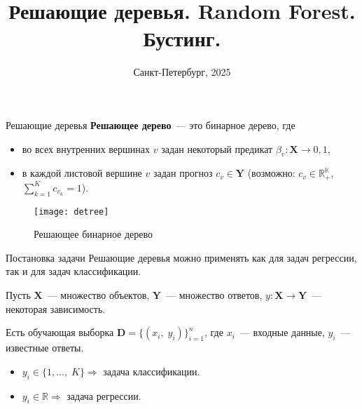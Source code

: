 \documentclass[notheorems, handout]{beamer}
\title[Статистическое и машинное обучение]{Решающие деревья. Random Forest. Бустинг.}
\institute[Санкт-Петербургский Государственный Университет]{%
	\small
	Санкт-Петербургский государственный университет\\
	Кафедра статистического моделирования
}
\date[Сентябрь 2025]{Санкт-Петербург, 2025}
\begin{document}
\begin{frame}
    \titlepage
\end{frame}

\begin{frame}{Решающие деревья}
\textbf{Решающее дерево}~--- это бинарное дерево, где
\begin{itemize}
	\item во всех внутренних вершинах $v$ задан некоторый предикат $\beta_{v}: \mathbf{X} \to {0{,} 1}$,
	\item в каждой листовой вершине $v$ задан прогноз $c_{v} \in \mathbf{Y}$ (возможно: $c_{v} \in \mathbb{R_{+}^{K}}$, \; $\displaystyle\sum_{k = 1}^{K} c_{v_{k}} = 1$).
\end{itemize}
\par\smallskip
\begin{figure}[h!]
  \texttt{[image: detree]}
 \caption{Решающее бинарное дерево}
 \end{figure}
\end{frame}

\begin{frame}{Постановка задачи}
Решающие деревья можно применять как для задач регрессии,
так и для задач классификации. 
\par\smallskip
Пусть $\mathbf{X}$~--- множество объектов, $\mathbf{Y}$~--- множество ответов, $y: \mathbf{X} \to \mathbf{Y}$~--- некоторая зависимость.
\par\smallskip
Есть обучающая выборка $\mathbf{D} = \{(x_{i}{,} \; y_{i})\}_{i = 1}^{n}$, где $x_{i}$~--- входные данные, $y_{i}$~--- известные ответы.
\par\smallskip
\begin{itemize}
	\item $y_{i} \in \{1{,}\dots{,}\;K\} \Rightarrow$ задача классификации.
	\item $y_{i} \in \mathbb{R} \Rightarrow$ задача регрессии.
\end{itemize}
\end{frame}
\end{document}
